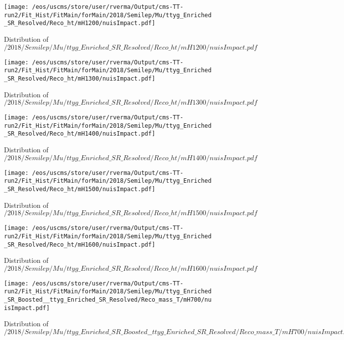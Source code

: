 \begin{figure}
\centering
\texttt{[image: /eos/uscms/store/user/rverma/Output/cms-TT-run2/Fit\_Hist/FitMain/forMain/2018/Semilep/Mu/ttyg\_Enriched\_SR\_Resolved/Reco\_ht/mH1200/nuisImpact.pdf]}
\caption{Distribution of $/2018/Semilep/Mu/ttyg\_Enriched\_SR\_Resolved/Reco\_ht/mH1200/nuisImpact.pdf$}
\end{figure}

\begin{figure}
\centering
\texttt{[image: /eos/uscms/store/user/rverma/Output/cms-TT-run2/Fit\_Hist/FitMain/forMain/2018/Semilep/Mu/ttyg\_Enriched\_SR\_Resolved/Reco\_ht/mH1300/nuisImpact.pdf]}
\caption{Distribution of $/2018/Semilep/Mu/ttyg\_Enriched\_SR\_Resolved/Reco\_ht/mH1300/nuisImpact.pdf$}
\end{figure}

\begin{figure}
\centering
\texttt{[image: /eos/uscms/store/user/rverma/Output/cms-TT-run2/Fit\_Hist/FitMain/forMain/2018/Semilep/Mu/ttyg\_Enriched\_SR\_Resolved/Reco\_ht/mH1400/nuisImpact.pdf]}
\caption{Distribution of $/2018/Semilep/Mu/ttyg\_Enriched\_SR\_Resolved/Reco\_ht/mH1400/nuisImpact.pdf$}
\end{figure}

\begin{figure}
\centering
\texttt{[image: /eos/uscms/store/user/rverma/Output/cms-TT-run2/Fit\_Hist/FitMain/forMain/2018/Semilep/Mu/ttyg\_Enriched\_SR\_Resolved/Reco\_ht/mH1500/nuisImpact.pdf]}
\caption{Distribution of $/2018/Semilep/Mu/ttyg\_Enriched\_SR\_Resolved/Reco\_ht/mH1500/nuisImpact.pdf$}
\end{figure}

\begin{figure}
\centering
\texttt{[image: /eos/uscms/store/user/rverma/Output/cms-TT-run2/Fit\_Hist/FitMain/forMain/2018/Semilep/Mu/ttyg\_Enriched\_SR\_Resolved/Reco\_ht/mH1600/nuisImpact.pdf]}
\caption{Distribution of $/2018/Semilep/Mu/ttyg\_Enriched\_SR\_Resolved/Reco\_ht/mH1600/nuisImpact.pdf$}
\end{figure}

\begin{figure}
\centering
\texttt{[image: /eos/uscms/store/user/rverma/Output/cms-TT-run2/Fit\_Hist/FitMain/forMain/2018/Semilep/Mu/ttyg\_Enriched\_SR\_Boosted\_\_ttyg\_Enriched\_SR\_Resolved/Reco\_mass\_T/mH700/nuisImpact.pdf]}
\caption{Distribution of $/2018/Semilep/Mu/ttyg\_Enriched\_SR\_Boosted\_\_ttyg\_Enriched\_SR\_Resolved/Reco\_mass\_T/mH700/nuisImpact.pdf$}
\end{figure}

